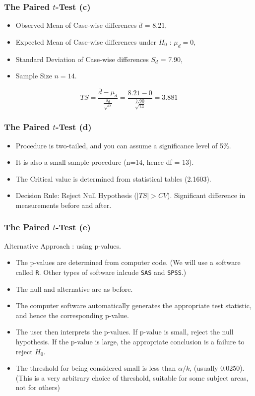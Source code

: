 \documentclass[a4]{beamer}
\begin{document}
\begin{frame}[fragile]
\frametitle{The Paired $t$-Test (c)}
\begin{itemize}
\item Observed Mean of Case-wise differences $\bar{d}$ = 8.21,
\item Expected Mean of Case-wise differences under $H_0$ : $\mu_d = 0$,
\item Standard Deviation of Case-wise differences $S_d$ = 7.90,
\item Sample Size $n=14$.
\end{itemize}

\[ TS = \frac{\bar{d} - \mu_d}{\frac{s_d}{\sqrt{n}}} = \frac{8.21 - 0}{\frac{7.90}{\sqrt{14}}} = 3.881 \]
\end{frame}
\begin{frame}[fragile]
\frametitle{The Paired $t$-Test (d)}

\begin{itemize}
\item Procedure is two-tailed, and you can assume a significance level of 5\%.
\item It is also a small sample procedure (n=14, hence df = 13).
\item The Critical value is determined from statistical tables (2.1603).
\item Decision Rule: Reject Null Hypothesis ($|TS|>CV$). Significant difference in measurements before and after.
\end{itemize}

\end{frame}
\begin{frame}[fragile]
\frametitle{The Paired $t$-Test (e)}
Alternative Approach : using p-values.
\begin{itemize}
\item The p-values are determined from computer code. (We will use a software called \texttt{R}. Other types of software inlcude \texttt{SAS} and \texttt{SPSS}.)
\item The null and alternative are as before.
\item The computer software automatically generates the appropriate test statistic, and hence the corresponding p-value.
\item The user then interprets the p-values. If p-value is small, reject the null hypothesis. If the p-value is large, the appropriate conclusion is a failure to reject $H_0$.
\item The threshold for being considered small is less than $\alpha/k$, (usually 0.0250). (This is a very arbitrary choice of threshold, suitable for some subject areas, not for others)
\end{itemize}
\end{frame}
\end{document}
